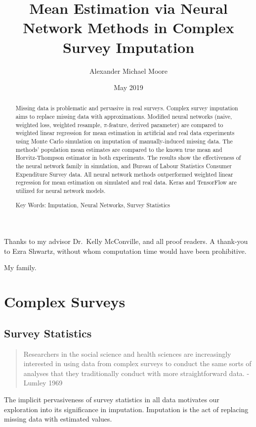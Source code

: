 \documentclass[12pt,twoside]{reedthesis}
\title{Mean Estimation via Neural Network Methods in Complex Survey Imputation}
\author{Alexander Michael Moore}
\date{May 2019}
\begin{document}
  \maketitle

\frontmatter %
\pagestyle{empty} %
  \begin{acknowledgements}
    Thanks to my advisor Dr.~Kelly McConville, and all proof readers. A
    thank-you to Ezra Shwartz, without whom computation time would have been
    prohibitive.
  \end{acknowledgements}

  \hypersetup{linkcolor=black}
  \setcounter{tocdepth}{2}
  \tableofcontents

  \listoftables

  \listoffigures
  \begin{abstract}
    Missing data is problematic and pervasive in real surveys. Complex
    survey imputation aims to replace missing data with approximations.
    Modified neural networks (naive, weighted loss, weighted resample,
    \(\pi\)-feature, derived parameter) are compared to weighted linear
    regression for mean estimation in artificial and real data experiments
    using Monte Carlo simulation on imputation of manually-induced missing
    data. The methods' population mean estimates are compared to the known
    true mean and Horvitz-Thompson estimator in both experiments. The
    results show the effectiveness of the neural network family in
    simulation, and Bureau of Labour Statistics Consumer Expenditure Survey
    data. All neural network methods outperformed weighted linear regression
    for mean estimation on simulated and real data. Keras and TensorFlow are
    utilized for neural network models.
    
    Key Words: Imputation, Neural Networks, Survey Statistics
  \end{abstract}
  \begin{dedication}
    My family.
  \end{dedication}
\mainmatter %
\pagestyle{fancyplain} %

\chapter{Complex Surveys}\label{complex-surveys}

\section{Survey Statistics}\label{survey-statistics}
\begin{quote}
Researchers in the social science and health sciences are increasingly
interested in using data from complex surveys to conduct the same sorts
of analyses that they traditionally conduct with more straightforward
data. - Lumley 1969
\end{quote}
The implicit pervasiveness of survey statistics in all data motivates
our exploration into its significance in imputation. Imputation is the
act of replacing missing data with estimated values.
\end{document}
